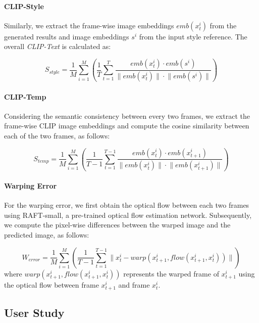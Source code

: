 \paragraph{CLIP-Style} Similarly, we extract the frame-wise image embeddings $emb(x_t^i)$ from the generated results and image embeddings $s^i$ from the input style reference. The overall \textit{CLIP-Text} is calculated as:

\begin{equation}
    S_{style} = \frac{1}{M}\sum_{i = 1}^{M}(\frac{1}{T}\sum_{t=1}^{T}\frac{emb(x_t^i) \cdot emb(s^i)}{\lVert emb(x_t^i) \rVert \cdot \lVert emb(s^i) \rVert})
\end{equation}

\paragraph{CLIP-Temp} Considering the semantic consistency between every two frames, we extract the frame-wise CLIP image embeddings and compute the cosine similarity between each of the two frames, as follows:

\begin{equation}
    S_{temp} = \frac{1}{M}\sum_{i = 1}^{M}(\frac{1}{T-1}\sum_{t=1}^{T - 1}\frac{emb(x_t^i) \cdot emb(x_{t + 1}^i)}{\lVert emb(x_t^i) \rVert \cdot \lVert emb(x_{t + 1}^i) \rVert})
\end{equation}

\paragraph{Warping Error} For the warping error, we first obtain the optical flow between each two frames using RAFT-small\cite{teed2020raft}, a pre-trained optical flow estimation network. Subsequently, we compute the pixel-wise differences between the warped image and the predicted image, as follows:

\begin{equation}
    W_{error} = \frac{1}{M}\sum_{i = 1}^{M}(\frac{1}{T-1}\sum_{t=1}^{T - 1} \lVert x_t^i - warp(x_{t + 1}^i, flow(x_{t + 1}^i, x_{t}^i))\rVert)
\end{equation}
where $warp(x_{t + 1}^i, flow(x_{t + 1}^i, x_{t}^i))$ represents the warped frame of $x_{t + 1}^i$ using the optical flow between frame $x_{t + 1}^i$ and frame $x_{t}^i$.


\subsection{User Study}

